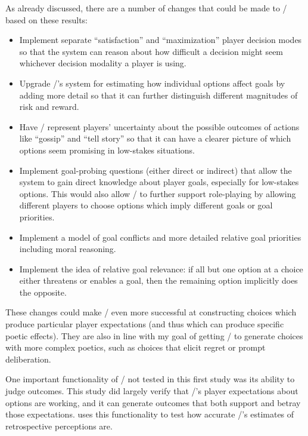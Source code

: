 As already discussed, there are a number of changes that could be made to \dunyazad/ based on these results:
%
\begin{itemize}
  \item Implement separate ``satisfaction'' and ``maximization'' player decision modes so that the system can reason about how difficult a decision might seem whichever decision modality a player is using.
  \item Upgrade \dunyazad/'s system for estimating how individual options affect goals by adding more detail so that it can further distinguish different magnitudes of risk and reward.
  \item Have \dunyazad/ represent players' uncertainty about the possible outcomes of actions like ``gossip'' and ``tell story'' so that it can have a clearer picture of which options seem promising in low-stakes situations.
  \item Implement goal-probing questions (either direct or indirect) that allow the system to gain direct knowledge about player goals, especially for low-stakes options. This would also allow \dunyazad/ to further support role-playing by allowing different players to choose options which imply different goals or goal priorities.
  \item Implement a model of goal conflicts and more detailed relative goal priorities including moral reasoning.
  \item Implement the idea of relative goal relevance: if all but one option at a choice either threatens or enables a goal, then the remaining option implicitly does the opposite.
\end{itemize}
%
These changes could make \dunyazad/ even more successful at constructing choices which produce particular player expectations (and thus which can produce specific poetic effects).
%
They are also in line with my goal of getting \dunyazad/ to generate choices with more complex poetics, such as choices that elicit regret or prompt deliberation.


One important functionality of \dunyazad/ not tested in this first study was its ability to judge outcomes.
%
This study did largely verify that \dunyazad/'s player expectations about options are working, and it can generate outcomes that both support and betray those expectations.
%
 uses this functionality to test how accurate \dunyazad/'s estimates of retrospective perceptions are.



